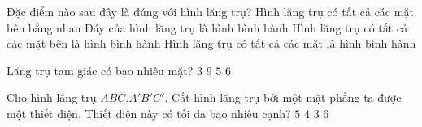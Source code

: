 \begin{ex}%
	Đặc điểm nào sau  đây là đúng với hình lăng trụ?
	\choice 
		{Hình lăng trụ có tất cả các mặt bên bằng nhau} 
		{Đáy của hình lăng trụ là hình  bình hành}
		 {\True Hình lăng trụ có tất cả các mặt bên là hình bình hành}
		{Hình lăng  trụ có tất cả các mặt là hình bình hành}
\end{ex}

\begin{ex}%
	Lăng trụ tam giác  có bao nhiêu mặt?
	\choice 
		 {$3$}
		 {$9$}
		{\True $5$} 
		 {$6$}
\end{ex}

\begin{ex}%
	Cho hình lăng trụ $ABC.A'B'C'$. Cắt hình lăng trụ bởi một mặt phẳng ta được một thiết diện. Thiết diện này có tối  đa bao nhiêu cạnh?
	\choice 
		{\True $5$} 
		 {$4$}
		{$3$} 
		{$6$} 
\end{ex}



